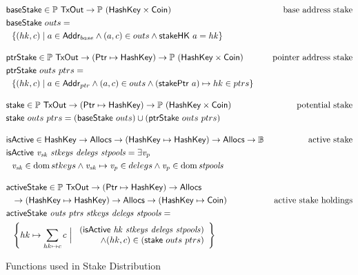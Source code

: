 \begin{figure}[htb]
  \begin{align*}
      & \fun{baseStake} \in \powerset{\TxOut} \to \powerset{(\HashKey \times \Coin)}
      & \text{base address stake} \\
      & \fun{baseStake}~{outs} = \\
      & ~~ \{(hk, c) \mid a\in\Addr_{base} \land (a, c) \in outs \land \fun{stakeHK}~a = hk \}
      \nextdef
      & \fun{ptrStake} \in \powerset{\TxOut} \to (\Ptr \mapsto \HashKey)
          \to \powerset{(\HashKey \times \Coin)}
      & \text{pointer address stake} \\
      & \fun{ptrStake}~{outs}~{ptrs} = \\
      & ~~ \{(hk, c) \mid a\in\Addr_{ptr} \land (a, c) \in outs \land (\fun{stakePtr}~a)\mapsto hk \in ptrs \}
      \nextdef
      & \fun{stake} \in \powerset{\TxOut} \to (\Ptr \mapsto \HashKey)
          \to \powerset{(\HashKey \times \Coin)}
      & \text{potential stake} \\
      & \fun{stake}~{outs}~{ptrs} = (\fun{baseStake}~{outs}) \cup (\fun{ptrStake}~{outs}~{ptrs})
      \nextdef
      & \fun{isActive} \in \HashKey \to \Allocs \to (\HashKey \mapsto \HashKey) \to \Allocs \to \mathbb{B}
      & \text{active stake} \\
      & \isActive{v_{sk}}{stkeys}{delegs}{stpools} = \exists \var{v_{p}}\\
      & ~~ \var{v_{sk}} \in \dom stkeys
              \land \var{v_{sk}}\mapsto\var{v_{p}} \in delegs
              \land \var{v_{p}} \in \dom \var{stpools}
      \nextdef
      & \fun{activeStake} \in \powerset{\TxOut} \to (\Ptr \mapsto \HashKey) \to \Allocs\\
      & ~~\to (\HashKey \mapsto \HashKey) \to \Allocs \to (\HashKey \mapsto \Coin)
      & \text{active stake holdings} \\
      & \activeStake{outs}{ptrs}{stkeys}{delegs}{stpools} = \\
      & ~~ \left\{
             hk\mapsto \sum_{hk\mapsto c}c
             ~\Big\vert~
             \begin{array}{r}
             (\isActive{hk}{stkeys}{delegs}{stpools}) \\
             \land (hk, c) \in (\fun{stake}~{outs}~{ptrs})
             \end{array}
           \right\}
  \end{align*}
  \caption{Functions used in Stake Distribution}
  \label{fig:functions:stake-distribution}
\end{figure}

